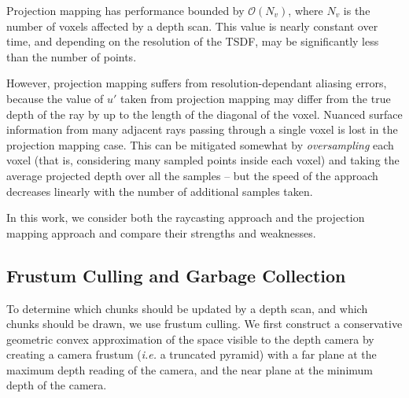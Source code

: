 \documentclass[conference,10pt]{IEEEtran}
\begin{document}
Projection mapping has performance bounded by $\mathcal{O}(N_v)$, where $N_v$ is
the number of voxels affected by a depth scan. This value is nearly constant
over time, and depending on the resolution of the TSDF, may be significantly
less than the number of points.

However, projection mapping suffers from resolution-dependant aliasing errors,
because the value of $u'$ taken from projection mapping may differ from the true
depth of the ray by up to the length of the diagonal of the voxel. Nuanced
surface information from many adjacent rays passing through a single voxel is
lost in the projection mapping case. This can be mitigated somewhat by
\textit{oversampling} each voxel (that is, considering many sampled points
inside each voxel) and taking the average projected depth over all the samples
-- but the speed of the approach decreases linearly with the number of
additional samples taken.

In this work, we consider both the raycasting approach and the projection
mapping approach and compare their strengths and weaknesses.

\subsection{Frustum Culling and Garbage Collection}
To determine which chunks should be updated by a depth scan, and which chunks
should be drawn, we use frustum culling. We first construct a conservative
geometric convex approximation of the space visible to the depth camera by
creating a camera frustum (\textit{i.e.} a truncated pyramid) with a far plane
at the maximum depth reading of the camera, and the near plane at the minimum
depth of the camera. 
\end{document}
